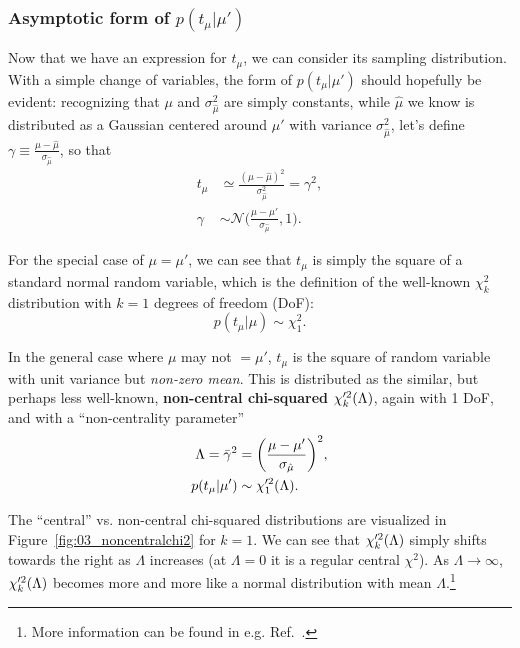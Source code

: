 \subsubsection{Asymptotic form of \texorpdfstring{$p(t_\mu|\mu')$}{p(t\_µ|µ')}}

Now that we have an expression for $t_\mu$, we can consider its sampling distribution.
With a simple change of variables, the form of $p(t_\mu|\mu')$ should hopefully be evident:
recognizing that $\mu$ and $\sigma_{\hat\mu}^2$ are simply constants, while $\hat\mu$ we know is distributed as a Gaussian centered around $\mu'$ with variance $\sigma_{\hat\mu}^2$, let's define $\gamma \equiv \frac{\mu-\hat\mu}{\sigma_{\hat\mu}}$, so that
\begin{align}
    t_\mu &\simeq \frac{(\mu-\hat\mu)^2}{\sigma_{\hat\mu}^2} = \gamma^2, \\
    \gamma &\sim \mathcal N \bigg(\frac{\mu - \mu'}{\sigma_{\hat\mu}}, 1 \bigg).
\label{eq:03_plr_gamma}
\end{align}

For the special case of $\mu = \mu'$, we can see that $t_\mu$ is simply the square of a standard normal random variable, which is the definition of the well-known $\chi^2_k$ distribution with $k=1$ degrees of freedom (DoF):
\begin{equation}
    p(t_\mu|\mu) \sim \chi^2_1.
\label{eq:03_chi2}
\end{equation}

In the general case where $\mu$ may not $ = \mu'$, $t_\mu$ is the square of random variable with unit variance but \textit{non-zero mean}.
This is distributed as the similar, but perhaps less well-known, \textbf{non-central chi-squared $\chi^{\prime 2}_k(\Lambda)$}, again with 1 DoF, and with a ``non-centrality parameter''
\begin{align}
    \Lambda = \bar\gamma^2 &= \bigg(\frac{\mu - \mu'}{\sigma_{\hat\mu}}\bigg)^2,
  \label{eq:03_Lambda} \\
    p(t_\mu|\mu') &\sim \chi^{\prime 2}_1(\Lambda).
  \label{eq:03_noncentralchi2}
\end{align}

The ``central'' vs. non-central chi-squared distributions are visualized in Figure~\ref{fig:03_noncentralchi2} for $k = 1$.
We can see that $\chi^{\prime 2}_k(\Lambda)$ simply shifts towards the right as $\Lambda$ increases (at $\Lambda = 0$ it is a regular central $\chi^2$).
As $\Lambda \rightarrow \infty$, $\chi^{\prime 2}_k(\Lambda)$ becomes more and more like a normal distribution with mean $\Lambda$.\footnote{More information can be found in e.g. Ref.~\cite{enwiki:1256854724}.
}

